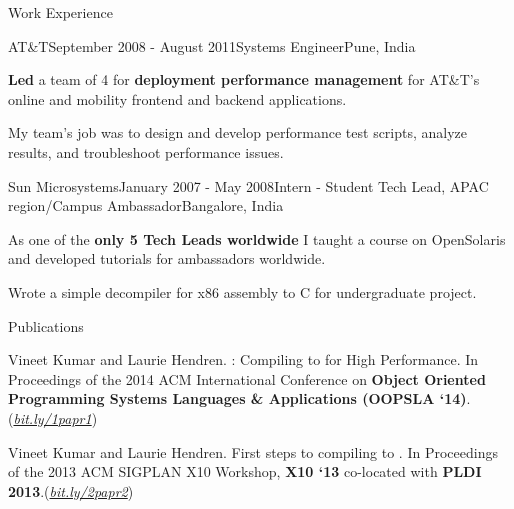 \documentclass{resume} %
\begin{document}
\begin{rSection}{Work Experience}
\begin{rSubsection}{AT\&T}{September 2008 - August
        2011}{Systems Engineer}{Pune, India}
\item \textbf{Led} a team of 4 for \textbf{deployment performance management}
	for AT\&T's online and mobility frontend and backend applications.
\begin{lsubSubsection}
\item My team's job was to design and develop performance test scripts, analyze
	results, and troubleshoot performance issues.  
\end{lsubSubsection}
\end{rSubsection}

\begin{rSubsection}{Sun Microsystems}{January 2007 - May 2008}{Intern - Student
        Tech Lead, APAC region/Campus Ambassador}{Bangalore, India}
\item As one of the \textbf{only 5 Tech Leads worldwide} I taught a course on OpenSolaris and developed tutorials for ambassadors worldwide.
\item Wrote a simple decompiler for x86 assembly to C for undergraduate project.
\end{rSubsection}
\end{rSection}


\begin{rSection}{Publications}
\smallskip
\begin{lSubsection}


\item Vineet Kumar and Laurie Hendren. \mixten: Compiling \matlab to \xten for
	High Performance. In Proceedings of the 2014 ACM International
	Conference on \textbf{Object Oriented Programming Systems Languages \&
	Applications (OOPSLA `14)}.(\href{http://bit.ly/1papr1}{\em{bit.ly/1papr1}})

%
\item Vineet Kumar and Laurie Hendren. First steps to compiling \matlab to
	\xten. In Proceedings of the 2013 ACM SIGPLAN X10 Workshop, \textbf{X10
	`13} co-located with \textbf{PLDI
	2013}.(\href{http://bit.ly/2papr2}{\em{bit.ly/2papr2}})
\end{lSubsection}
\end{rSection}
\end{document}
